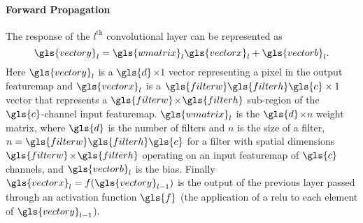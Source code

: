 \documentclass[thesis]{subfiles}
\begin{document}
    \paragraph{Forward Propagation}
    The response of the $l^\text{th}$ convolutional layer can be represented as
    \begin{equation}
    \gls{vectory}_l =\gls{wmatrix}_l \gls{vectorx}_l + \gls{vectorb}_l.
    \end{equation}
    Here $\gls{vectory}_l$ is a $\gls{d}$$\times$$1$ vector representing a pixel in the output \gls{featuremap} and $\gls{vectorx}_l$ is a $\gls{filterw} \gls{filterh} \gls{c} \times 1$ vector that represents a $\gls{filterw}$$\times$$\gls{filterh}$ sub-region of the $\gls{c}$-channel input \gls{featuremap}. $\gls{wmatrix}_l$ is the $\gls{d}$$\times$$n$ weight matrix, where $\gls{d}$ is the number of filters and $n$ is the size of a filter, \ie $n = \gls{filterw} \gls{filterh} \gls{c}$ for a filter with spatial dimensions $\gls{filterw}$$\times$$\gls{filterh}$ operating on an input \gls{featuremap} of $\gls{c}$ channels, and $\gls{vectorb}_l$ is the bias. Finally $\gls{vectorx}_l = f(\gls{vectory}_{l-1})$ is the output of the previous layer passed through an activation function $\gls{f}$ (\eg the application of a \gls{relu} to each element of $\gls{vectory}_{l-1}$).
    
\end{document}

